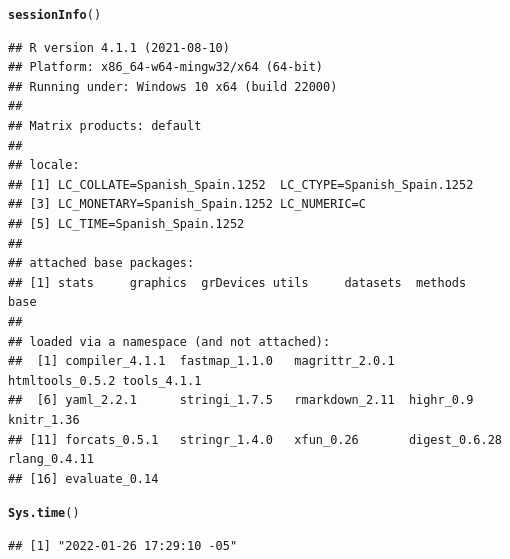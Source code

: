 \documentclass{article}\usepackage[]{graphicx}\usepackage[]{color}
\makeatletter
\newcommand{\hlstd}[1]{\textcolor[rgb]{0.345,0.345,0.345}{#1}}%
\newcommand{\hlkwd}[1]{\textcolor[rgb]{0.737,0.353,0.396}{\textbf{#1}}}%
\newenvironment{kframe}{%
 \def\at@end@of@kframe{}%
 \ifinner\ifhmode%
  \def\at@end@of@kframe{\end{minipage}}%
  \begin{minipage}{\columnwidth}%
 \fi\fi%
 \def\FrameCommand##1{\hskip\@totalleftmargin \hskip-\fboxsep
 \colorbox{shadecolor}{##1}\hskip-\fboxsep
     \hskip-\linewidth \hskip-\@totalleftmargin \hskip\columnwidth}%
 \MakeFramed {\advance\hsize-\width
   \@totalleftmargin\z@ \linewidth\hsize
   \@setminipage}}%
 {\par\unskip\endMakeFramed%
 \at@end@of@kframe}
\newenvironment{knitrout}{}{} %
\makeatother
\begin{document}
\begin{knitrout}
\color{fgcolor}\begin{kframe}
\begin{alltt}
\hlkwd{sessionInfo}\hlstd{()}
\end{alltt}
\begin{verbatim}
## R version 4.1.1 (2021-08-10)
## Platform: x86_64-w64-mingw32/x64 (64-bit)
## Running under: Windows 10 x64 (build 22000)
## 
## Matrix products: default
## 
## locale:
## [1] LC_COLLATE=Spanish_Spain.1252  LC_CTYPE=Spanish_Spain.1252   
## [3] LC_MONETARY=Spanish_Spain.1252 LC_NUMERIC=C                  
## [5] LC_TIME=Spanish_Spain.1252    
## 
## attached base packages:
## [1] stats     graphics  grDevices utils     datasets  methods   base     
## 
## loaded via a namespace (and not attached):
##  [1] compiler_4.1.1  fastmap_1.1.0   magrittr_2.0.1  htmltools_0.5.2 tools_4.1.1    
##  [6] yaml_2.2.1      stringi_1.7.5   rmarkdown_2.11  highr_0.9       knitr_1.36     
## [11] forcats_0.5.1   stringr_1.4.0   xfun_0.26       digest_0.6.28   rlang_0.4.11   
## [16] evaluate_0.14
\end{verbatim}
\begin{alltt}
\hlkwd{Sys.time}\hlstd{()}
\end{alltt}
\begin{verbatim}
## [1] "2022-01-26 17:29:10 -05"
\end{verbatim}
\end{kframe}
\end{knitrout}
\end{document}
